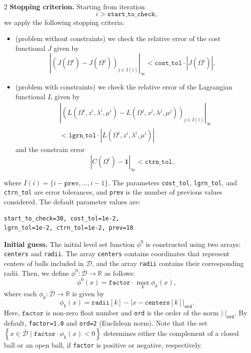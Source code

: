 \documentclass[a4paper, oneside]{article}
\newcommand{\code}[1]{\texttt{#1}}
\begin{document}
\begin{multicols}{2}
\vspace*{0.5cm}
\noindent \textbf{Stopping criterion.}
Starting from iteration
\[
i>\code{start\_to\_check},
\]
we apply the following stopping criteria:
\begin{itemize}[left=0.0em]
	\item (problem without constraints) we check the relative error of the cost functional $J$ given by
	\[
		\left|(J(\Omega^i)-J(\Omega^j))_{j\in I(i)}\right|_{\infty}<\code{cost\_tol}\cdot |J(\Omega^i)|,
	\]
	\item (problem with constraints) we check the relative error of the Lagrangian functional $L$ given by
	\begin{align*}
		&\left|(L(\Omega^i, z^i, \lambda^i, \mu^i)-L(\Omega^j, z^j,\lambda^j,\mu^j))_{j\in I(i)}\right|_\infty\\
		&<\code{lgrn\_tol}\cdot|L(\Omega^i,z^i,\lambda^i,\mu^i)|
	\end{align*}
	and the constrain error
	\[
		|C(\Omega^i)-\textbf{1}|_\infty<\code{ctrn\_tol},
	\]
\end{itemize}
where $I(i) = \{i-\code{prev}, \dots,i-1\}$.
The parameters \code{cost\_tol}, \code{lgrn\_tol}, and \code{ctrn\_tol} 
are error tolerances, and \code{prev} is
the number of previous values considered.
The default parameter values are:
\begin{lstlisting}
start_to_check=30, cost_tol=1e-2,
lgrn_tol=1e-2, ctrn_tol=1e-2, prev=10	
\end{lstlisting}

\vspace*{0.5cm}
\noindent \textbf{Initial guess.}
The initial level set function $\phi^0$ is constructed
using two arrays:  \code{centers} and \code{radii}.
The array \code{centers} contains coordinates that
represent centers of balls included in $\mathcal{D}$,
and the array \code{radii} contains their corresponding radii.
Then, we define $\phi^0: \mathcal{\overline{D}} \rightarrow \mathds{R}$ as follows:
\begin{equation} \label{eq:phi0}
	\phi^0(x)= \code{factor} \cdot \max_k \phi_k(x),	
\end{equation}
where each $\phi_k :\mathcal{\overline{D}} \rightarrow \mathds{R}$ is given by
\begin{equation}
\phi_k(x) = \code{radii}[k] - \left|x - \code{centers}[k]\right|_{\code{ord}}. 
\end{equation}
Here, $\code{factor}$ is non-zero float number and \code{ord}
is the order of the norm $\left|\cdot\right|_{\code{ord}}$.
By default, \code{factor=1.0} and \code{ord=2} (Euclidean norm).
Note that the set
$\left\{x\in\overline{\mathcal{D}}\mid \code{factor} \cdot \phi_k(x) < 0\right\}$
determines either the complement of a closed ball
or an open ball, if \code{factor} is positive or negative, respectively.


\end{multicols}
\end{document}
